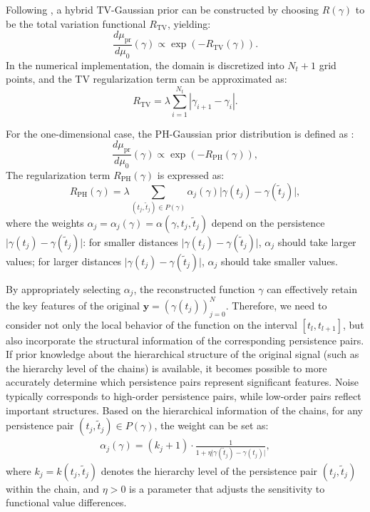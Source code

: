 \documentclass{ws-mplb}
\begin{document}
Following \cite{Yao2016}, a hybrid TV-Gaussian prior can be constructed by choosing $R(\gamma)$ to be the total variation functional $R_{\text{TV}}$, yielding:
\begin{equation}\label{eqntv}
\frac{d\mu_{\text{pr}}}{d\mu_0}(\gamma) \propto \exp\left(-R_{\text{TV}}(\gamma)\right).
\end{equation}
In the numerical implementation, the domain is discretized into \(N_t+1\) grid points, and the TV regularization term can be approximated as:
\begin{equation}\label{termtv}
R_{\text{TV}} = \lambda\sum_{i=1}^{N_t} |\gamma_{i+1} - \gamma_i|.
\end{equation}


For the one-dimensional case, the PH-Gaussian prior distribution is defined as \cite{Deng2025}:
\begin{equation}\label{eqnph}
\frac{d\mu_{\text{pr}}}{d\mu_0}(\gamma) \propto \exp\left( -R_{\text{PH}}(\gamma)\right),
\end{equation}
The regularization term \( R_{\text{PH}}(\gamma)\) is expressed as:
\begin{equation}\label{termph}
R_{\text{PH}}(\gamma) = \lambda\sum_{(t_j, \tilde{t}_j) \in P(\gamma)} \alpha_j(\gamma) \vert \gamma(t_j) - \gamma(\tilde{t}_j) \vert,
\end{equation}
where the weights \(\alpha_j = \alpha_j(\gamma) = \alpha(\gamma, t_j, \tilde{t}_j)\) depend on the persistence \(\vert \gamma(t_j) - \gamma(\tilde{t}_j) \vert\): for smaller distances \(\vert \gamma(t_j) - \gamma(\tilde{t}_j) \vert\), \(\alpha_j\) should take larger values; for larger distances \(\vert \gamma(t_j) - \gamma(\tilde{t}_j) \vert\), \(\alpha_j\) should take smaller values. 

By appropriately selecting \(\alpha_j\), the reconstructed function \(\gamma\) can effectively retain the key features of the original \(\mathbf{y} = (\gamma(t_j))_{j=0}^N\). Therefore, we need to consider not only the local behavior of the function on the interval \([t_l, t_{l+1}]\), but also incorporate the structural information of the corresponding persistence pairs. If prior knowledge about the hierarchical structure of the original signal (such as the hierarchy level of the chains) is available, it becomes possible to more accurately determine which persistence pairs represent significant features. Noise typically corresponds to high-order persistence pairs, while low-order pairs reflect important structures. Based on the hierarchical information of the chains, for any persistence pair \((t_j, \tilde{t}_j) \in P(\gamma)\), the weight can be set as:
\begin{align}
\alpha_j(\gamma) = {(k_j + 1)} \cdot \frac{1}{1 + \eta \vert \gamma(\tilde{t}_j) - \gamma(t_j) \vert},
\end{align}
where  \(k_j = k(t_j, \tilde{t}_j)\) denotes the hierarchy level of the persistence pair \((t_j, \tilde{t}_j)\) within the chain, and \(\eta > 0\) is a parameter that adjusts the sensitivity to functional value differences.
\end{document}
